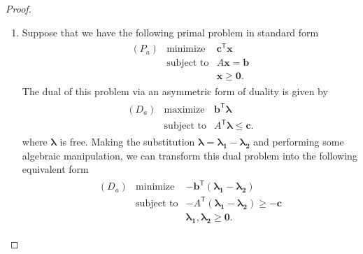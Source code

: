 \documentclass[12pt]{article}
\theoremstyle{definition}
\newcommand{\vc}[1]{\boldsymbol{#1}}
\newcommand{\tran}{\mathsf{T}}
\begin{document}
\begin{proof}
  \begin{enumerate}
    \item Suppose that we have the following primal problem in standard form
      \begin{align*}
        \begin{array}{lrl}
          (P_a) & \text{minimize} & \vc{c}^\tran\vc{x} \\
          & \text{subject to} & A\vc{x} = \vc{b} \\
          & & \vc{x} \geq \vc{0}.
        \end{array}
      \end{align*}
      The dual of this problem via an asymmetric form of duality is given by
      \begin{align*}
        \begin{array}{lrl}
          (D_a) & \text{maximize} & \vc{b}^\tran\vc{\lambda} \\
          & \text{subject to} & A^\tran\vc{\lambda} \leq \vc{c}.
        \end{array}
      \end{align*}
      where $\vc{\lambda}$ is free. Making the substitution $\vc{\lambda} = \vc{\lambda_1} - \vc{\lambda_2}$
      and performing some algebraic manipulation, we can transform this dual problem into the following
      equivalent form
      \begin{align*}
        \begin{array}{lrl}
          (D_a) & \text{minimize} & -\vc{b}^\tran(\vc{\lambda_1} - \vc{\lambda_2}) \\
          & \text{subject to} & -A^\tran(\vc{\lambda_1} - \vc{\lambda_2}) \geq -\vc{c} \\
          & & \vc{\lambda_1}, \vc{\lambda_2} \geq \vc{0}.
        \end{array}
      \end{align*}


\end{enumerate}
\end{proof}
\end{document}
